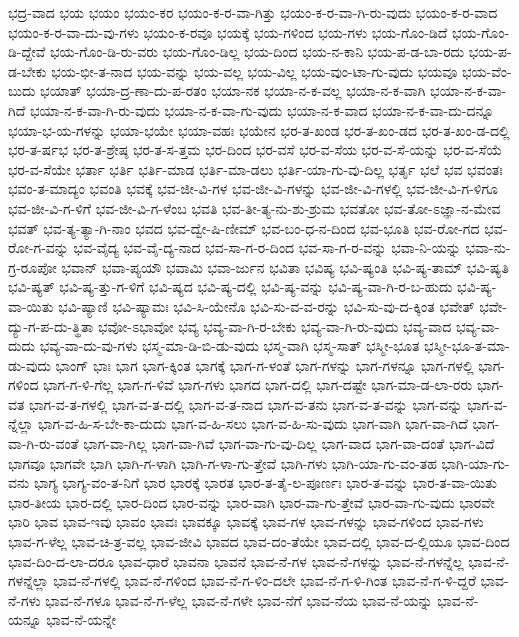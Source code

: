 {ಭದ್ರ-ವಾದ
ಭಯ
ಭಯಂ
ಭಯಂ-ಕರ
ಭಯಂ-ಕ-ರ-ವಾ-ಗಿತ್ತು
ಭಯಂ-ಕ-ರ-ವಾ-ಗಿ-ರು-ವುದು
ಭಯಂ-ಕ-ರ-ವಾದ
ಭಯಂ-ಕ-ರ-ವಾ-ದು-ವು-ಗಳು
ಭಯಂ-ಕ-ರವೂ
ಭಯಕ್ಕೆ
ಭಯ-ಗಳಿಂದ
ಭಯ-ಗಳು
ಭಯ-ಗೊಂ-ಡಿದೆ
ಭಯ-ಗೊಂ-ಡಿ-ದ್ದೇವೆ
ಭಯ-ಗೊಂ-ಡಿ-ರು-ವರು
ಭಯ-ಗೊಂ-ಡಿಲ್ಲ
ಭಯ-ದಿಂದ
ಭಯ-ನ-ಕಾನಿ
ಭಯ-ಪ-ಡ-ಬಾ-ರದು
ಭಯ-ಪ-ಡ-ಬೇಕು
ಭಯ-ಭೀ-ತ-ನಾದ
ಭಯ-ವನ್ನು
ಭಯ-ವಲ್ಲ
ಭಯ-ವಿಲ್ಲ
ಭಯ-ವುಂ-ಟಾ-ಗು-ವುದು
ಭಯವೂ
ಭಯ-ವೆಂ-ಬುದು
ಭಯಾತ್
ಭಯಾ-ದ್ರ-ಣಾ-ದು-ಪ-ರತಂ
ಭಯಾ-ನಕ
ಭಯಾ-ನ-ಕ-ವಲ್ಲ
ಭಯಾ-ನ-ಕ-ವಾಗಿ
ಭಯಾ-ನ-ಕ-ವಾ-ಗಿದೆ
ಭಯಾ-ನ-ಕ-ವಾ-ಗಿ-ರು-ವುದು
ಭಯಾ-ನ-ಕ-ವಾ-ಗು-ವುದು
ಭಯಾ-ನ-ಕ-ವಾದ
ಭಯಾ-ನ-ಕ-ವಾ-ದು-ದನ್ನೂ
ಭಯಾ-ಭ-ಯ-ಗಳನ್ನು
ಭಯಾ-ಭಯೇ
ಭಯಾ-ವಹಃ
ಭಯೇನ
ಭರ-ತ-ಖಂಡ
ಭರ-ತ-ಖಂ-ಡದ
ಭರ-ತ-ಖಂ-ಡ-ದಲ್ಲಿ
ಭರ-ತ-ರ್ಷಭ
ಭರ-ತ-ಶ್ರೇಷ್ಠ
ಭರ-ತ-ಸ-ತ್ತಮ
ಭರ-ದಿಂದ
ಭರ-ವಸೆ
ಭರ-ವ-ಸೆಯ
ಭರ-ವ-ಸೆ-ಯನ್ನು
ಭರ-ವ-ಸೆಯೆ
ಭರ-ವ-ಸೆಯೇ
ಭರ್ತಾ
ಭರ್ತಿ
ಭರ್ತಿ-ಮಾಡ
ಭರ್ತಿ-ಮಾ-ಡಲು
ಭರ್ತಿ-ಯಾ-ಗು-ವು-ದಿಲ್ಲ
ಭರ್ತೃ
ಭಲೆ
ಭವ
ಭವಂತಃ
ಭವಂ-ತ-ಮಾದ್ಯಂ
ಭವಂತಿ
ಭವಕ್ಕೆ
ಭವ-ಜೀ-ವಿ-ಗಳ
ಭವ-ಜೀ-ವಿ-ಗಳನ್ನು
ಭವ-ಜೀ-ವಿ-ಗಳಲ್ಲಿ
ಭವ-ಜೀ-ವಿ-ಗ-ಳಿಗೂ
ಭವ-ಜೀ-ವಿ-ಗ-ಳಿಗೆ
ಭವ-ಜೀ-ವಿ-ಗ-ಳೆಂಬ
ಭವತಿ
ಭವ-ತೀ-ತ್ಯ-ನು-ಶು-ಶ್ರುಮ
ಭವತೋ
ಭವ-ತೋ-ಽಜ್ಞಾ-ನ-ಮೇವ
ಭವತ್
ಭವ-ತ್ಯ-ತ್ಯಾ-ಗಿ-ನಾಂ
ಭವದ
ಭವ-ದ್ವೇ-ಷಿ-ಣೀಮ್
ಭವ-ಬಂ-ಧ-ನ-ದಿಂದ
ಭವ-ಭೂತಿ
ಭವ-ರೋ-ಗದ
ಭವ-ರೋ-ಗ-ವನ್ನು
ಭವ-ವೈದ್ಯ
ಭವ-ವೈ-ದ್ಯ-ನಾದ
ಭವ-ಸಾ-ಗ-ರ-ದಿಂದ
ಭವ-ಸಾ-ಗ-ರ-ವನ್ನು
ಭವಾ-ನಿ-ಯನ್ನು
ಭವಾ-ನು-ಗ್ರ-ರೂಪೋ
ಭವಾನ್
ಭವಾ-ಪ್ಯಯೌ
ಭವಾಮಿ
ಭವಾ-ರ್ಜುನ
ಭವಿತಾ
ಭವಿಷ್ಯ
ಭವಿ-ಷ್ಯಂತಿ
ಭವಿ-ಷ್ಯ-ತಾಮ್
ಭವಿ-ಷ್ಯತಿ
ಭವಿ-ಷ್ಯತ್
ಭವಿ-ಷ್ಯ-ತ್ತು-ಗ-ಳಿಗೆ
ಭವಿ-ಷ್ಯದ
ಭವಿ-ಷ್ಯ-ದಲ್ಲಿ
ಭವಿ-ಷ್ಯ-ವನ್ನು
ಭವಿ-ಷ್ಯ-ವಾ-ಗಿ-ರ-ಬ-ಹುದು
ಭವಿ-ಷ್ಯ-ವಾ-ಯಿತು
ಭವಿ-ಷ್ಯಾಣಿ
ಭವಿ-ಷ್ಯಾಮಃ
ಭವಿ-ಸಿ-ಯೇನೊ
ಭವಿ-ಸು-ವ-ವ-ರನ್ನು
ಭವಿ-ಸು-ವು-ದ-ಕ್ಕಿಂತ
ಭವೇತ್
ಭವೇ-ದ್ಯು-ಗ-ಪ-ದು-ತ್ಥಿತಾ
ಭವೋ-ಽಭಾವೋ
ಭವ್ಯ
ಭವ್ಯ-ವಾ-ಗಿ-ರ-ಬೇಕು
ಭವ್ಯ-ವಾ-ಗಿ-ರು-ವುದು
ಭವ್ಯ-ವಾದ
ಭವ್ಯ-ವಾ-ದುದು
ಭವ್ಯ-ವಾ-ದು-ವು-ಗಳು
ಭಸ್ಮ-ಮಾ-ಡಿ-ಬಿ-ಡು-ವುದು
ಭಸ್ಮ-ವಾಗಿ
ಭಸ್ಮ-ಸಾತ್
ಭಸ್ಮೀ-ಭೂತ
ಭಸ್ಮೀ-ಭೂ-ತ-ಮಾ-ಡು-ವುದು
ಭಾಂಗ್
ಭಾಃ
ಭಾಗ
ಭಾಗ-ಕ್ಕಿಂತ
ಭಾಗಕ್ಕೆ
ಭಾಗ-ಗ-ಳಂತೆ
ಭಾಗ-ಗಳನ್ನು
ಭಾಗ-ಗಳನ್ನೂ
ಭಾಗ-ಗಳಲ್ಲಿ
ಭಾಗ-ಗಳಿಂದ
ಭಾಗ-ಗ-ಳಿ-ಗೆಲ್ಲ
ಭಾಗ-ಗ-ಳಿವೆ
ಭಾಗ-ಗಳು
ಭಾಗದ
ಭಾಗ-ದಲ್ಲಿ
ಭಾಗ-ದಷ್ಟೇ
ಭಾಗ-ಮಾ-ಡ-ಲಾ-ರರು
ಭಾಗ-ವತ
ಭಾಗ-ವ-ತ-ಗಳಲ್ಲಿ
ಭಾಗ-ವ-ತ-ದಲ್ಲಿ
ಭಾಗ-ವ-ತ-ನಾದ
ಭಾಗ-ವ-ತನು
ಭಾಗ-ವ-ತ-ವನ್ನು
ಭಾಗ-ವನ್ನು
ಭಾಗ-ವ-ನ್ನೆಲ್ಲಾ
ಭಾಗ-ವ-ಹಿ-ಸ-ಬೇ-ಕಾ-ದುದು
ಭಾಗ-ವ-ಹಿ-ಸಲು
ಭಾಗ-ವ-ಹಿ-ಸು-ವುದು
ಭಾಗ-ವಾಗಿ
ಭಾಗ-ವಾ-ಗಿದೆ
ಭಾಗ-ವಾ-ಗಿ-ರು-ವಂತೆ
ಭಾಗ-ವಾ-ಗಿಲ್ಲ
ಭಾಗ-ವಾ-ಗಿವೆ
ಭಾಗ-ವಾ-ಗು-ವು-ದಿಲ್ಲ
ಭಾಗ-ವಾದ
ಭಾಗ-ವಾ-ದಂತೆ
ಭಾಗ-ವಿದೆ
ಭಾಗವೂ
ಭಾಗವೇ
ಭಾಗಿ
ಭಾಗಿ-ಗ-ಳಾಗಿ
ಭಾಗಿ-ಗ-ಳಾ-ಗು-ತ್ತೇವೆ
ಭಾಗಿ-ಗಳು
ಭಾಗಿ-ಯಾ-ಗು-ವಂ-ತಹ
ಭಾಗಿ-ಯಾ-ಗು-ವನು
ಭಾಗ್ಯ
ಭಾಗ್ಯ-ವಂ-ತ-ನಿಗೆ
ಭಾರ
ಭಾರಕ್ಕೆ
ಭಾರತ
ಭಾರ-ತ-ತೈ-ಲ-ಪೂರ್ಣಃ
ಭಾರ-ತ-ವನ್ನು
ಭಾರ-ತ-ವಾ-ಯಿತು
ಭಾರ-ತೀಯ
ಭಾರ-ದಲ್ಲಿ
ಭಾರ-ದಿಂದ
ಭಾರ-ವನ್ನು
ಭಾರ-ವಾಗಿ
ಭಾರ-ವಾ-ಗು-ತ್ತೇವೆ
ಭಾರ-ವಾ-ಗು-ವುದು
ಭಾರವೇ
ಭಾರಿ
ಭಾವ
ಭಾವ-ಇವು
ಭಾವಂ
ಭಾವಃ
ಭಾವಕ್ಕೂ
ಭಾವಕ್ಕೆ
ಭಾವ-ಗಳ
ಭಾವ-ಗಳನ್ನು
ಭಾವ-ಗಳಿಂದ
ಭಾವ-ಗಳು
ಭಾವ-ಗ-ಳೆಲ್ಲ
ಭಾವ-ಚಿ-ತ್ರ-ವಲ್ಲ
ಭಾವ-ಜೀವಿ
ಭಾವದ
ಭಾವ-ದಂ-ತೆಯೇ
ಭಾವ-ದಲ್ಲಿ
ಭಾವ-ದ-ಲ್ಲಿಯೂ
ಭಾವ-ದಿಂದ
ಭಾವ-ದಿಂ-ದ-ಲಾ-ದರೂ
ಭಾವ-ಧಾರೆ
ಭಾವನಾ
ಭಾವನೆ
ಭಾವ-ನೆ-ಗಳ
ಭಾವ-ನೆ-ಗಳನ್ನು
ಭಾವ-ನೆ-ಗಳನ್ನೆಲ್ಲ
ಭಾವ-ನೆ-ಗಳನ್ನೆಲ್ಲಾ
ಭಾವ-ನೆ-ಗಳಲ್ಲಿ
ಭಾವ-ನೆ-ಗಳಿಂದ
ಭಾವ-ನೆ-ಗ-ಳಿಂ-ದಲೇ
ಭಾವ-ನೆ-ಗ-ಳಿ-ಗಿಂತ
ಭಾವ-ನೆ-ಗ-ಳಿ-ದ್ದರೆ
ಭಾವ-ನೆ-ಗಳು
ಭಾವ-ನೆ-ಗಳೂ
ಭಾವ-ನೆ-ಗ-ಳೆಲ್ಲ
ಭಾವ-ನೆ-ಗಳೇ
ಭಾವ-ನೆಗೆ
ಭಾವ-ನೆಯ
ಭಾವ-ನೆ-ಯನ್ನು
ಭಾವ-ನೆ-ಯನ್ನೂ
ಭಾವ-ನೆ-ಯನ್ನೇ
}
